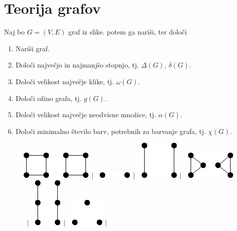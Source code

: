 \documentclass[11pt,paper=b5,footinclude,headinclude]{scrbook} %
\newtheorem{ex}{Vaja\hypertarget{sol:\theex}}[chapter]
\begin{document}
\section{Teorija grafov}
\begin{ex}
    Naj bo $G=(V,E)$ graf iz slike. potem ga nariši, ter določi
	\begin{enumerate}
    \item Nariši graf.
		\item Določi največjo in najmanjšo stopnjo, tj. $\Delta(G)$, $\delta(G)$.
		\item Določi velikost največje klike, tj. $\omega(G)$.
		\item Določi ožino grafa, tj. $g(G)$.
		\item Določi velikost največje neodvisne množice, tj. $\alpha(G)$.
		\item Določi minimalno število barv, potrebnih za barvanje grafa, tj. $\chi(G)$.
	\end{enumerate}
    \begin{figure}
  	\centering
  	\includegraphics[scale=0.5]{smallGraphs/g_2C4.png}$\,\mid\,$\
\includegraphics[scale=0.5]{smallGraphs/g_2K1.png}$\,\mid\,$\
\includegraphics[scale=0.5]{smallGraphs/g_2K2.png}$\,\mid\,$\
\includegraphics[scale=0.5]{smallGraphs/g_2K3.png}$\,\mid\,$\
\includegraphics[scale=0.5]{smallGraphs/g_2P3.png}$\,\mid\,$\
\includegraphics[scale=0.5]{smallGraphs/g_3K1.png}$\,\mid\,$\

\end{figure}
\end{ex}
\end{document}
